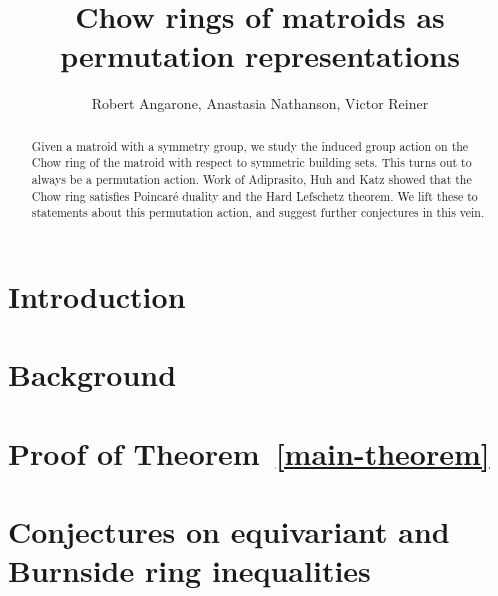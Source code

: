 \documentclass{amsart}
\title{Chow rings of matroids as permutation representations}
\author{Robert Angarone, Anastasia Nathanson, Victor Reiner}
\theoremstyle{plain}
\theoremstyle{definition}
\begin{document}
\maketitle

\begin{abstract}
Given a matroid with a symmetry group, we study the induced group action on the Chow ring of the matroid with respect to symmetric building sets. This turns out to always be a permutation action. Work of
Adiprasito, Huh and Katz showed that the Chow ring satisfies Poincar\'e duality and
the Hard Lefschetz theorem.  We lift these to statements about this permutation action,
and suggest further conjectures in this vein.
\end{abstract}

\section{Introduction}
\label{intro-section}


\section{Background}
\label{background-section}


\section{Proof of Theorem~\ref{main-theorem}}
\label{main-theorem-section}


\section{Conjectures on equivariant and Burnside ring inequalities}
\label{conjectures-section}



\printbibliography
\end{document}
